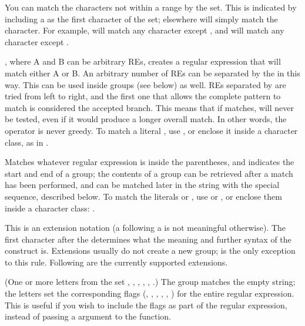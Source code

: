 \begin{list}{}{\leftmargin 0.7in }
You can match the characters not within a range by 
the set.  This is indicated by including a
\character{\textasciicircum} as the first character of the set;
\character{\textasciicircum} elsewhere will simply match the
\character{\textasciicircum} character.  For example,
\regexp{[{\textasciicircum}5]} will match
any character except , and
\regexp{[\textasciicircum\code{\textasciicircum}]} will match any character
except \character{\textasciicircum}.

\item[\character{|}], where A and B can be arbitrary REs,
creates a regular expression that will match either A or B.  An
arbitrary number of REs can be separated by the \character{|} in this
way.  This can be used inside groups (see below) as well.  REs
separated by \character{|} are tried from left to right, and the first
one that allows the complete pattern to match is considered the
accepted branch.  This means that if  matches,  will
never be tested, even if it would produce a longer overall match.  In
other words, the \character{|} operator is never greedy.  To match a
literal \character{|}, use \regexp{\e|}, or enclose it inside a
character class, as in \regexp{[|]}.

\item[\code{(...)}] Matches whatever regular expression is inside the
parentheses, and indicates the start and end of a group; the contents
of a group can be retrieved after a match has been performed, and can
be matched later in the string with the  special
sequence, described below.  To match the literals \character{(} or
\character{)}, use \regexp{\e(} or \regexp{\e)}, or enclose them
inside a character class: \regexp{[(] [)]}.

\item[\code{(?...)}] This is an extension notation (a 
following a \character{(} is not meaningful otherwise).  The first
character after the 
determines what the meaning and further syntax of the construct is.
Extensions usually do not create a new group;
 is the only exception to this rule.
Following are the currently supported extensions.

\item[\code{(?iLmsux)}] (One or more letters from the set ,
, , , ,
.)  The group matches the empty string; the letters set
the corresponding flags (, ,
, , , )
for the entire regular expression.  This is useful if you wish to
include the flags as part of the regular expression, instead of
passing a  argument to the  function.


\end{list}
